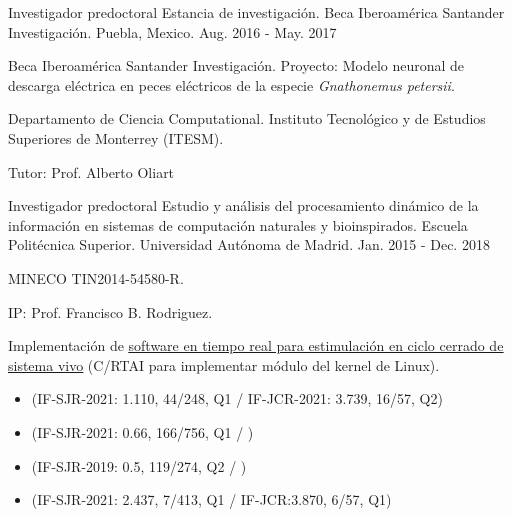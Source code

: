 \begin{cventries}
  \cventry
    {Investigador predoctoral} %
    {Estancia de investigación. Beca Iberoamérica Santander Investigación.} %
    {Puebla, Mexico.} %
    {Aug. 2016 - May. 2017} %
    {
    \begin{cvitems}
     \item {Beca Iberoamérica Santander Investigación. Proyecto: Modelo neuronal de descarga eléctrica en peces eléctricos de la especie \textit{Gnathonemus petersii}.}
     \item {Departamento de Ciencia Computational. Instituto Tecnológico y de Estudios Superiores de Monterrey (ITESM).}
     \item {Tutor: Prof. Alberto Oliart}
    \end{cvitems}
    }


  \cventry
    {Investigador predoctoral} %
    {Estudio y análisis del procesamiento dinámico de la información en sistemas de computación naturales y bioinspirados.} %
    {Escuela Politécnica Superior. Universidad Autónoma de Madrid.} %
    {Jan. 2015 - Dec. 2018} %
    {
      \begin{cvitems} %
        \item {MINECO TIN2014-54580-R.}
        \item {IP: Prof. Francisco B. Rodriguez.}
        \item {Implementación de \underline{\href{http://arantxa.ii.uam.es/~gnb/material.htm}{software en tiempo real para estimulación en ciclo cerrado de sistema vivo}} (C/RTAI para implementar módulo del kernel de Linux).}
      \end{cvitems}
    }

\end{cventries}


\begin{itemize}
\item {} (IF-SJR-2021: 1.110, 44/248, Q1 / IF-JCR-2021: 3.739, 16/57, Q2)

\item {} (IF-SJR-2021: 0.66, 166/756, Q1 / )

\item {} (IF-SJR-2019: 0.5, 119/274, Q2 / )

\item {} (IF-SJR-2021: 2.437, 7/413, Q1 / IF-JCR:3.870, 6/57, Q1)
\end{itemize}


